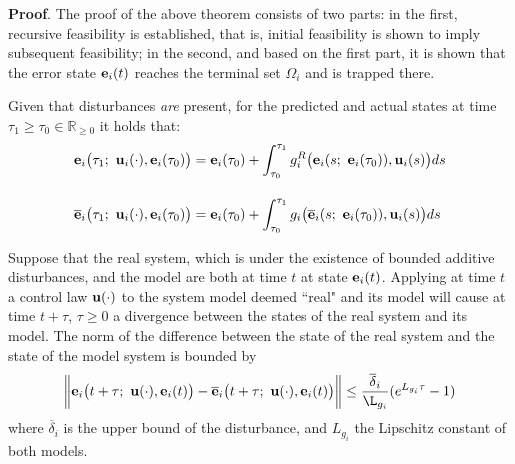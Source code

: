 \textbf{Proof}. The proof of the above theorem consists of two parts:
in the first, recursive feasibility is established, that is, initial
feasibility is shown to imply subsequent feasibility; in the second, and based
on the first part, it is shown that the error state $\bm{\mathbf{e}}_i(t)$ reaches
the terminal set $\Omega_i$ and is trapped there.


\begin{bw_box}
  \begin{remark}
    Given that disturbances \textit{are} present, for the predicted and actual
    states at time $\tau_1 \geq \tau_0 \in \mathbb{R}_{\geq 0}$ it holds that:
    \begin{align}
      \bm{\mathbf{e}}_i\big(\tau_1;\ \bm{\mathbf{u}}_i(\cdot), \bm{\mathbf{e}}_i(\tau_0)\big) &=
        \bm{\mathbf{e}}_i(\tau_0) + \int_{\tau_0}^{\tau_1} g_i^R\big(\bm{\mathbf{e}}_i(s;\ \bm{\mathbf{e}}_i(\tau_0)), \bm{\mathbf{u}}_i(s)\big) ds \\[2.5ex]
      \overline{\bm{\mathbf{e}}}_i\big(\tau_1;\ \bm{\mathbf{u}}_i(\cdot), \bm{\mathbf{e}}_i(\tau_0)\big) &=
        \bm{\mathbf{e}}_i(\tau_0) + \int_{\tau_0}^{\tau_1} g_i\big(\overline{\bm{\mathbf{e}}}_i(s;\ \bm{\mathbf{e}}_i(\tau_0)), \bm{\mathbf{u}}_i(s)\big) ds
    \end{align}
    \label{remark:predicted_actual_equations_with_disturbance}
  \end{remark}
\end{bw_box}


\begin{bw_box}
  \begin{lemma}
    \label{lemma:diff_state_from_same_conditions}
    Suppose that the real system, which is under the existence of bounded
    additive disturbances, and the model are both at time $t$ at state
    $\bm{\mathbf{e}}_i(t)$. Applying at time $t$ a control law $\bm{\mathbf{u}}(\cdot)$
    to the system model deemed ``real" and its model will cause at time $t + \tau$,
    $\tau \geq 0$ a divergence between the states of the real system and its
    model. The norm of the difference between the state of the real system
    and the state of the model system is bounded by
    \begin{align}
      \bigg\| \vect{e}_i\big(t + \tau;\ \vect{u}(\cdot), \vect{e}_i(t)\big) -
        \overline{\vect{e}}_i\big(t + \tau;\ \vect{u}(\cdot), \vect{e}_i(t)\big) \bigg\|
        \leq \dfrac{\overline{\delta}_i}{\L_{g_i}} (e^{L_{g_i} \tau} - 1)
    \end{align}
    where $\overline{\delta}_i$ is the upper bound of the disturbance,
    and $L_{g_i}$ the Lipschitz constant of both models.
  \end{lemma}
\end{bw_box}


